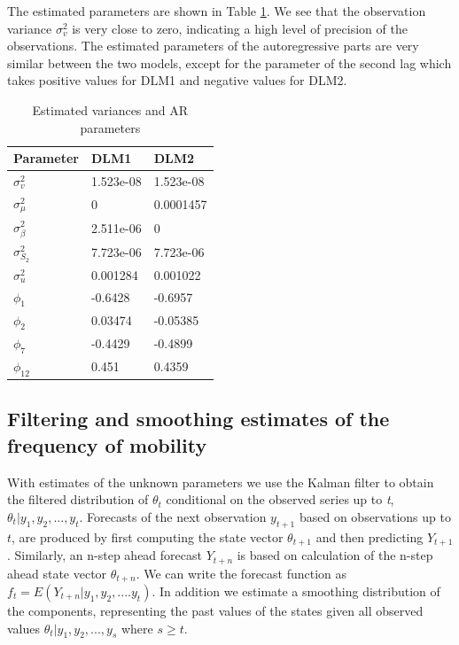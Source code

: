 \documentclass[]{article}
\begin{document}
The estimated parameters are shown in Table
\ref{tab:estimated-parameters}. We see that the observation variance
\(\sigma_{v}^{2}\) is very close to zero, indicating a high level of
precision of the observations. The estimated parameters of the
autoregressive parts are very similar between the two models, except for
the parameter of the second lag which takes positive values for DLM1 and
negative values for DLM2.

\begin{table}[t]

\caption{\label{tab:estimated-parameters}Estimated variances and AR parameters}
\centering
\begin{tabular}{lll}
\toprule
Parameter & DLM1 & DLM2\\
\midrule
$\sigma_{v}^{2}$ & 1.523e-08 & 1.523e-08\\
$\sigma_{\mu}^{2}$ & 0 & 0.0001457\\
$\sigma_{\beta}^{2}$ & 2.511e-06 & 0\\
$\sigma_{S_{2}}^{2}$ & 7.723e-06 & 7.723e-06\\
$\sigma^{2}_{u}$ & 0.001284 & 0.001022\\
\addlinespace
$\phi_{1}$ & -0.6428 & -0.6957\\
$\phi_{2}$ & 0.03474 & -0.05385\\
$\phi_{7}$ & -0.4429 & -0.4899\\
$\phi_{12}$ & 0.451 & 0.4359\\
\bottomrule
\end{tabular}
\end{table}

\subsection{Filtering and smoothing estimates of the frequency of
mobility}\label{filtering-and-smoothing-estimates-of-the-frequency-of-mobility}

With estimates of the unknown parameters we use the Kalman filter to
obtain the filtered distribution of \(\theta_{t}\) conditional on the
observed series up to \emph{t}, \(\theta_{t} | y_{1}, y_{2},...,y_{t}\).
Forecasts of the next observation \(y_{t+1}\) based on observations up
to \(t\), are produced by first computing the state vector
\(\theta_{t+1}\) and then predicting \(Y_{t+1}\). Similarly, an n-step
ahead forecast \(Y_{t+n}\) is based on calculation of the n-step ahead
state vector \(\theta_{t+n}\). We can write the forecast function as
\(f_{t} = E(Y_{t+n} | y_{1}, y_{2}, ....y_{t})\). In addition we
estimate a smoothing distribution of the components, representing the
past values of the states given all observed values
\(\theta_{t} | y_{1}, y_{2},...,y_{s}\) where \(s \ge t\).
\end{document}
